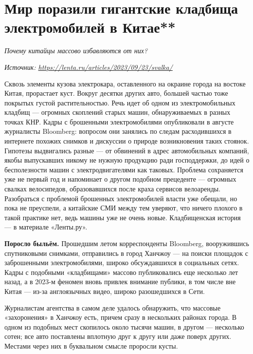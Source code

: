 \newpage
\section{Мир поразили гигантские кладбища электромобилей в Китае**}

\textit{Почему китайцы массово избавляются от них?}

\textit{Источник: \url{https://lenta.ru/articles/2023/09/23/svalka/}}

Сквозь элементы кузова электрокара, оставленного на окраине города на востоке Китая, прорастает куст. Вокруг  десятки других авто, большей частью тоже покрытых густой растительностью. Речь идет об одном из электромобильных кладбищ --- огромных скоплений старых машин, обнаруживаемых в разных точках КНР. Кадры с брошенными электромобилями опубликовали в августе журналисты Bloomberg: вопросом они занялись по следам расходившихся в интернете похожих снимков и дискуссии о природе возникновения таких стоянок. Гипотезы выдвигались разные — от обвинений в адрес автомобильных компаний, якобы выпускавших никому не нужную продукцию ради господдержки, до идей о бесполезности машин с электродвигателями как таковых. Проблема сохраняется уже не первый год и напоминает о другом подобном прецеденте — огромных свалках велосипедов, образовавшихся после краха сервисов велоаренды. Разобраться с проблемой брошенных электромобилей власти уже обещали, но пока не преуспели, а китайские СМИ между тем уверяют, что ничего плохого в такой практике нет, ведь машины уже не очень новые. Кладбищенская история — в материале «Ленты.ру».

\textbf{Поросло быльём.} Прошедшим летом корреспонденты Bloomberg, вооружившись спутниковыми снимками, отправились в город Ханчжоу --- на поиски площадок с заброшенными электромобилями, широко обсуждавшихся в социальных сетях. Кадры с подобными «кладбищами» массово публиковались еще несколько лет назад, а в 2023-м феномен вновь привлек внимание публики, в том числе вне Китая — из-за англоязычных видео, широко разошедшихся в Сети.

Журналистам агентства в самом деле удалось обнаружить, что массовые «захоронения» в Ханчжоу есть, причем сразу в нескольких районах города. В одном из подобных мест скопилось около тысячи машин, в другом — несколько сотен; все авто поставлены вплотную друг к другу или даже поверх других. Местами через них в буквальном смысле проросли кусты.

